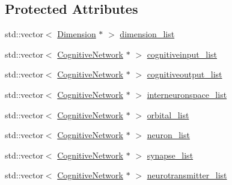 \subsection*{Protected Attributes}
\begin{DoxyCompactItemize}
\item 
std\+::vector$<$ \mbox{\hyperlink{classDimension}{Dimension}} $\ast$ $>$ \mbox{\hyperlink{classCognitiveNetwork_a79f0541fde6dd50f8e87f3f46d849b95}{dimension\+\_\+list}}
\item 
std\+::vector$<$ \mbox{\hyperlink{classCognitiveNetwork}{Cognitive\+Network}} $\ast$ $>$ \mbox{\hyperlink{classCognitiveNetwork_a5a46cefb188858fdc023df3abbac0a47}{cognitiveinput\+\_\+list}}
\item 
std\+::vector$<$ \mbox{\hyperlink{classCognitiveNetwork}{Cognitive\+Network}} $\ast$ $>$ \mbox{\hyperlink{classCognitiveNetwork_a7a57ad82736c0d8b03e7607b5c603b00}{cognitiveoutput\+\_\+list}}
\item 
std\+::vector$<$ \mbox{\hyperlink{classCognitiveNetwork}{Cognitive\+Network}} $\ast$ $>$ \mbox{\hyperlink{classCognitiveNetwork_aaf69f6e0cc0084eb748ef1540c773f85}{interneuronspace\+\_\+list}}
\item 
std\+::vector$<$ \mbox{\hyperlink{classCognitiveNetwork}{Cognitive\+Network}} $\ast$ $>$ \mbox{\hyperlink{classCognitiveNetwork_a263efd10857d5507c0e889e48f7329fe}{orbital\+\_\+list}}
\item 
std\+::vector$<$ \mbox{\hyperlink{classCognitiveNetwork}{Cognitive\+Network}} $\ast$ $>$ \mbox{\hyperlink{classCognitiveNetwork_abbb9ff97e1b9cd61602d95f44c30132e}{neuron\+\_\+list}}
\item 
std\+::vector$<$ \mbox{\hyperlink{classCognitiveNetwork}{Cognitive\+Network}} $\ast$ $>$ \mbox{\hyperlink{classCognitiveNetwork_a9218de9d63b10b313df289d1312c81e0}{synapse\+\_\+list}}
\item 
std\+::vector$<$ \mbox{\hyperlink{classCognitiveNetwork}{Cognitive\+Network}} $\ast$ $>$ \mbox{\hyperlink{classCognitiveNetwork_a7018bee3dbf538c3d0c81a64aa002ab8}{neurotransmitter\+\_\+list}}
\end{DoxyCompactItemize}
